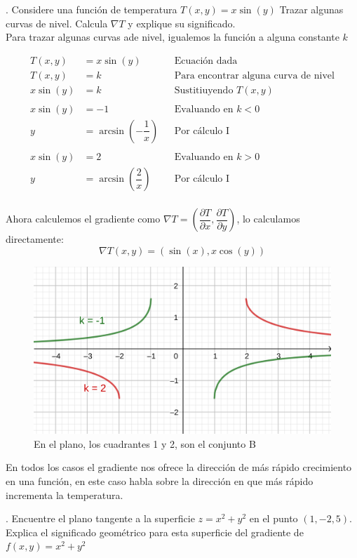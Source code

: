 \documentclass[letterpaper]{article}
\renewcommand{\d}{\partial}
\renewcommand{\*}{\cdot}
\theoremstyle{definition}
\begin{document}
. Considere una función de temperatura $ T(x,y) = x\sin(y) $ Trazar algunas curvas de nivel. Calcula $ \nabla T $ y explique su significado.\\

Para trazar algunas curvas ade nivel, igualemos la función a alguna constante $ k $

\begin{align*}
	T(x,y) &= x\sin(y) &&\text{Ecuación dada}\\
	T(x,y) &= k &&\text{Para encontrar alguna curva de nivel}\\
	x\sin(y) &= k &&\text{Sustitiuyendo }T(x,y)\\
	\\
	x\sin(y) &= -1 &&\text{Evaluando en  }k < 0\\
	y &= \arcsin\left(-\dfrac{1}{x}\right) &&\text{Por cálculo I }\\
	\\
	x\sin(y) &= 2 &&\text{Evaluando en  }k > 0\\
	y &= \arcsin\left(\dfrac{2}{x}\right)&&\text{Por cálculo I }\\	
\end{align*}


Ahora calculemos el gradiente como $ \nabla T = \left(\dfrac{\d T}{\d x}, \dfrac{\d T}{\d y}\right) $, lo calculamos directamente:
\[ \nabla T(x,y) = (\sin(x), x\cos(y)) \]


\begin{figure}[h]
	\centering
	\includegraphics[height=0.3\textwidth]{img/ej2}
	\caption{En el plano, los cuadrantes 1 y 2, son el conjunto B}
\end{figure}

En todos los casos el gradiente nos ofrece la dirección de más rápido crecimiento en una función, en este caso habla sobre la dirección en que más rápido incrementa la temperatura.

. Encuentre el plano tangente a la superficie $ z = x^2 + y^2 $ en el punto $ (1,-2,5) $. Explica el significado geométrico para esta superficie del gradiente de $ f(x,y)= x^2 + y^2 $\\
\end{document}
